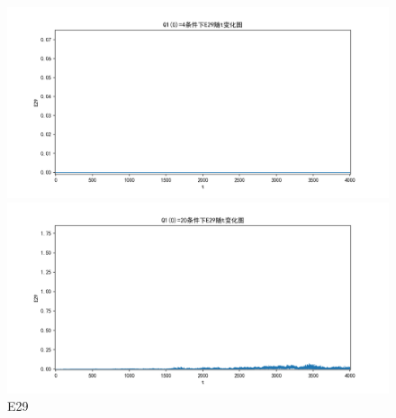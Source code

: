 \documentclass[10pt, a4paper]{article}
\begin{document}
    \begin{figure}[H]
        \begin{minipage}[t]{0.49\textwidth}
            \centering
            \includegraphics[width=\textwidth]{./q5_pics/cmp/E29.png}
        \end{minipage}
        \begin{minipage}[t]{0.49\textwidth}
            \centering
            \includegraphics[width=\textwidth]{./q5_pics/exp/E29.png}
        \end{minipage}
        \caption{E29}\label{fig:E29 in q5}
    \end{figure}
\end{document}
